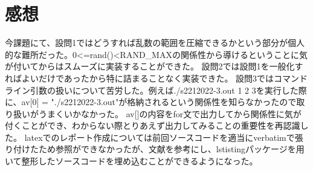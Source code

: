 \documentclass[fontsize = 10pt, paper= a4]{jlreq}
\begin{document}
\section{感想}
今課題にて、設問1ではどうすれば乱数の範囲を圧縮できるかという部分が個人的な難所だった。0<=rand()<RAND\_MAXの関係性から導けるということに気が付いてからはスムーズに実装することができた。
設問2では設問1を一般化すればよいだけであったから特に詰まることなく実装できた。
設問3ではコマンドライン引数の扱いについて苦労した。例えば./s2212022-3.out 1 2 3を実行した際に、av[0] = "./s2212022-3.out"が格納されるという関係性を知らなかったので取り扱いがうまくいかなかった。
av[]の内容をfor文で出力してから関係性に気が付くことができ、わからない際とりあえず出力してみることの重要性を再認識した。
latexでのレポート作成については前回ソースコードを適当にverbatimで張り付けたため参照ができなかったが、文献\cite{tab0}を参考にし、lstistingパッケージを用いて整形したソースコードを埋め込むことができるようになった。




\end{document}
